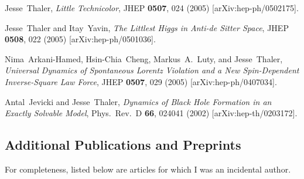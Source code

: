 \documentclass[11pt]{article}
\newcommand{\heading}[1]{\vspace{0in}\subsection*{#1} \vspace{.02in}}
\renewcommand{\bibitem}[1]{\item}
\begin{document}
\begin{list}{[]\addtocounter{jessecount}{-1}}{\leftmargin=3em \itemsep=4pt}
\bibitem{Thaler:2005kr}
  Jesse~Thaler,
  \emph{Little Technicolor},
  JHEP {\bf 0507}, 024 (2005)
  [arXiv:hep-ph/0502175].
  
\bibitem{Thaler:2005en}
  Jesse~Thaler and Itay~Yavin,
  \emph{The Littlest Higgs in Anti-de Sitter Space},
  JHEP {\bf 0508}, 022 (2005)
  [arXiv:hep-ph/0501036].
  
\bibitem{ArkaniHamed:2004ar}
  Nima~Arkani-Hamed, Hsin-Chia~Cheng, Markus~A.~Luty, and Jesse~Thaler,
  \emph{Universal Dynamics of Spontaneous Lorentz Violation and a New Spin-Dependent Inverse-Square Law Force},
  JHEP {\bf 0507}, 029 (2005)
  [arXiv:hep-ph/0407034].
  
\bibitem{Jevicki:2002fq}
  Antal~Jevicki and Jesse~Thaler,
  \emph{Dynamics of Black Hole Formation in an Exactly Solvable Model},
  Phys.\ Rev.\  D {\bf 66}, 024041 (2002)
  [arXiv:hep-th/0203172].
\end{list}


\heading{Additional Publications and Preprints}

For completeness, listed below are articles for which I was an incidental author.

\setcounter{jessecount}{6}
\end{document}
